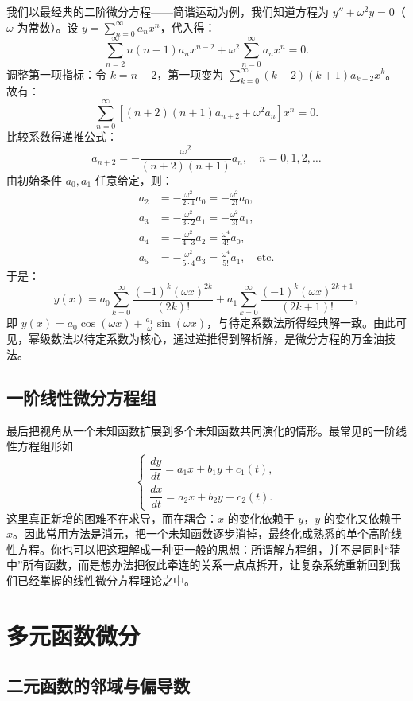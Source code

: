 \documentclass[UTF8]{ctexbook}
\begin{document}
我们以最经典的二阶微分方程——简谐运动为例，我们知道方程为 $y'' + \omega^2 y = 0$（$\omega$ 为常数）。设 $y = \sum_{n=0}^{\infty} a_n x^n$，代入得：
\[
\sum_{n=2}^{\infty} n(n-1)a_n x^{n-2} + \omega^2 \sum_{n=0}^{\infty} a_n x^n = 0.
\]
调整第一项指标：令 $k=n-2$，第一项变为 $\sum_{k=0}^{\infty} (k+2)(k+1)a_{k+2} x^k$。故有：
\[
\sum_{n=0}^{\infty} \left[ (n+2)(n+1)a_{n+2} + \omega^2 a_n \right] x^n = 0.
\]
比较系数得递推公式：
\[
a_{n+2} = -\frac{\omega^2}{(n+2)(n+1)} a_n, \quad n=0,1,2,\dots
\]
由初始条件 $a_0, a_1$ 任意给定，则：
\begin{align*}
a_2 &= -\frac{\omega^2}{2\cdot1}a_0 = -\frac{\omega^2}{2!}a_0, \\
a_3 &= -\frac{\omega^2}{3\cdot2}a_1 = -\frac{\omega^2}{3!}a_1, \\
a_4 &= -\frac{\omega^2}{4\cdot3}a_2 = \frac{\omega^4}{4!}a_0, \\
a_5 &= -\frac{\omega^2}{5\cdot4}a_3 = \frac{\omega^4}{5!}a_1, \quad \text{etc.}
\end{align*}
于是：
\[
y(x) = a_0 \sum_{k=0}^{\infty} \frac{(-1)^k (\omega x)^{2k}}{(2k)!} + a_1 \sum_{k=0}^{\infty} \frac{(-1)^k (\omega x)^{2k+1}}{(2k+1)!},
\]
即 $y(x) = a_0 \cos(\omega x) + \frac{a_1}{\omega} \sin(\omega x)$，与待定系数法所得经典解一致。由此可见，幂级数法以待定系数为核心，通过递推得到解析解，是微分方程的万金油技法。


\subsection{一阶线性微分方程组}
最后把视角从一个未知函数扩展到多个未知函数共同演化的情形。最常见的一阶线性方程组形如
\[
\begin{cases}
\dfrac{dy}{dt}=a_1x+b_1y+c_1(t),\\
\dfrac{dx}{dt}=a_2x+b_2y+c_2(t).
\end{cases}
\]
这里真正新增的困难不在求导，而在耦合：$x$ 的变化依赖于 $y$，$y$ 的变化又依赖于 $x$。因此常用方法是消元，把一个未知函数逐步消掉，最终化成熟悉的单个高阶线性方程。你也可以把这理解成一种更一般的思想：所谓解方程组，并不是同时“猜中”所有函数，而是想办法把彼此牵连的关系一点点拆开，让复杂系统重新回到我们已经掌握的线性微分方程理论之中。

\newpage

\section{多元函数微分}

\subsection{二元函数的邻域与偏导数}
\end{document}
